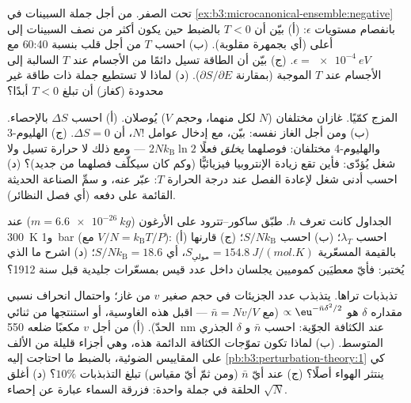 \begin{exercise}[$\star\star$]\label{exo:b3:microcanonical-ensemble:9}
تحت الصفر. من أجل جملة السبينات في
\cref{ex:b3:microcanonical-ensemble:negative} بانفصام مستويات
$\epsilon$: (أ) بيّن أن $T < 0$ بالضبط حين يكون أكثر من نصف السبينات
إلى أعلى (أي بجمهرة مقلوبة). (ب) احسب $T$ من أجل قلب بنسبة 60:40
مع $\epsilon = \qty{e-4}{eV}$. (ج) بيّن أن الطاقة تسيل دائمًا من
الأجسام عند $T$ السالبة إلى الأجسام عند $T$ الموجبة (بمقارنة $\partial
S/\partial E$). (د) لماذا لا تستطيع جملة ذات طاقة غير محدودة (كغاز)
أن تبلغ $T < 0$ أبدًا؟
\end{exercise}

\begin{exercise}[$\star\star\star$]\label{exo:b3:microcanonical-ensemble:10}
المزج كمّيًا. غازان مختلفان ($N$ لكل منهما، وحجم $V$)
يُوصلان. (أ) احسب $\Delta S$ بالإحصاء. (ب) ومن أجل الغاز نفسه:
بيّن، مع إدخال عوامل $N!$، أن $\Delta S = 0$. (ج) الهليوم-3 والهليوم-4
مختلفان: فوصلهما \emph{يخلق} فعلًا $2Nk_{\text{B}}\ln2$
--- ومع ذلك لا حرارة تسيل ولا شغل يُؤدّى: فأين تقع زيادة
الإنتروبيا فيزيائيًّا (وكم كان سيكلّف فصلهما من جديد)؟ (د)
احسب أدنى شغل لإعادة الفصل عند درجة الحرارة $T$: عبّر عنه، و
سمِّ الصناعة الحديثة القائمة على دفعه (أي فصل النظائر).
\end{exercise}

\begin{exercise}[$\star\star\star$]\label{exo:b3:microcanonical-ensemble:11}
الجداول كانت تعرف $h$. طبّق ساكور--تترود على الأرغون ($m =
\qty{6.6e-26}{kg}$) عند \qty{300}{K} و\qty{1}{bar} (مع $V/N =
k_{\text{B}}T/P$): (أ) احسب $\lambda_T$؛ (ب) احسب $S/N
k_{\text{B}}$؛ (ج) قارنها بالقيمة المسعّرية
$S_{\text{مولي}} = \qty{154.8}{J/(mol.K)}$، أي $S/Nk_{\text{B}}
= 18.6$؛ (د) اشرح ما الذي يُختبر: فأيّ معطيَين كموميين
يجلسان داخل عدد قيس بمسعّرات جليدية قبل
سنة 1912؟
\end{exercise}

\begin{exercise}[$\star\star\star$]\label{exo:b3:microcanonical-ensemble:12}
تذبذبات تراها. يتذبذب عدد الجزيئات في حجم صغير
$v$ من غاز؛ واحتمال انحراف نسبي مقداره
$\delta$ هو $\propto\eu^{-\bar n\delta^2/2}$ (مع $\bar n = Nv/V$ ---
اقبل هذه الغاوسية، أو استنتجها من ثنائي الحدّ). (أ) من أجل $v$
مكعبًا ضلعه \qty{550}{nm} عند الكثافة الجوّية: احسب $\bar n$ و
$\delta$ الجذري المتوسط. (ب) لماذا تكون تموّجات الكثافة الدائمة هذه، وهي
أجزاء قليلة من الألف على المقاييس الضوئية، بالضبط ما احتاجت إليه
\cref{pb:b3:perturbation-theory:1} كي ينتثر الهواء
أصلًا؟ (ج) عند أيّ $\bar n$ (ومن ثمّ أيّ مقياس) تبلغ التذبذبات
$10\%$؟ (د) أغلق الحلقة في جملة واحدة: فزرقة
السماء عبارة عن إحصاء $\sqrt N$.
\end{exercise}

